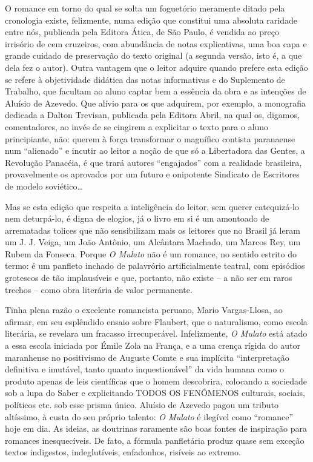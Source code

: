 \documentclass[
  letterpaper,
  DIV=11,
  numbers=noendperiod]{scrreprt}
\begin{document}
O romance em torno do qual se solta um foguetório meramente ditado pela
cronologia existe, felizmente, numa edição que constitui uma absoluta
raridade entre nós, publicada pela Editora Ática, de São Paulo, é
vendida ao preço irrisório de cem cruzeiros, com abundância de notas
explicativas, uma boa capa e grande cuidado de preservação do texto
original (a segunda versão, isto é, a que dela fez o autor). Outra
vantagem que o leitor adquire quando prefere esta edição se refere à
objetividade didática das notas informativas e do Suplemento de
Trabalho, que facultam ao aluno captar bem a essência da obra e as
intenções de Aluísio de Azevedo. Que alívio para os que adquirem, por
exemplo, a monografia dedicada a Dalton Trevisan, publicada pela Editora
Abril, na qual os, digamos, comentadores, ao invés de se cingirem a
explicitar o texto para o aluno principiante, não: querem à força
transformar o magnífico contista paranaense num ``alienado'' e incutir
ao leitor a noção de que só a Libertadora das Gentes, a Revolução
Panacéia, é que trará autores ``engajados'' com a realidade brasileira,
provavelmente os aprovados por um futuro e onipotente Sindicato de
Escritores de modelo soviético\ldots{}

Mas se esta edição que respeita a inteligência do leitor, sem querer
catequizá-lo nem deturpá-lo, é digna de elogios, já o livro em si é um
amontoado de arrematadas tolices que não sensibilizam mais os leitores
que no Brasil já leram um J. J. Veiga, um João Antônio, um Alcântara
Machado, um Marcos Rey, um Rubem da Fonseca. Porque \emph{O Mulato} não
é um romance, no sentido estrito do termo: é um panfleto inchado de
palavrório artificialmente teatral, com episódios grotescos de tão
implausíveis e que, portanto, não existe -- a não ser em raros trechos
-- como obra literária de valor permanente.

Tinha plena razão o excelente romancista peruano, Mario Vargas-Llosa, ao
afirmar, em seu esplêndido ensaio sobre Flaubert, que o naturalismo,
como escola literária, se revelara um fracasso irrecuperável.
Infelizmente, \emph{O Mulato} está atado a essa escola iniciada por
Émile Zola na França, e a uma crença rígida do autor maranhense no
positivismo de Auguste Comte e sua implícita ``interpretação definitiva
e imutável, tanto quanto inquestionável'' da vida humana como o produto
apenas de leis científicas que o homem descobrira, colocando a sociedade
sob a lupa do Saber e explicitando TODOS OS FENÔMENOS culturais,
sociais, políticos etc. sob esse prisma único. Aluísio de Azevedo pagou
um tributo altíssimo, à custa do seu próprio talento: \emph{O Mulato} é
ilegível como ``romance'' hoje em dia. As ideias, as doutrinas raramente
são boas fontes de inspiração para romances inesquecíveis. De fato, a
fórmula panfletária produz quase sem exceção textos indigestos,
indeglutíveis, enfadonhos, risíveis ao extremo.
\end{document}

